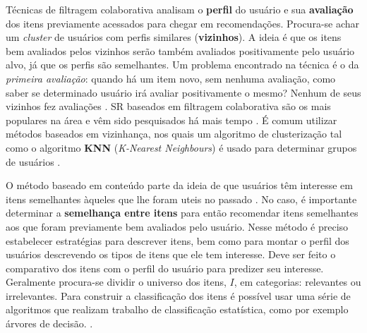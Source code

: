\documentclass[12pt]{article}
\begin{document}
Técnicas de filtragem colaborativa analisam o \textbf{perfil} do usuário e sua \textbf{avaliação} dos itens previamente acessados para chegar em recomendações. Procura-se achar um \textit{cluster} de usuários com perfis similares (\textbf{vizinhos}). A ideia é que os itens bem avaliados pelos vizinhos serão também avaliados positivamente pelo usuário alvo, já que os perfis são semelhantes. Um problema encontrado na técnica é o da \textit{primeira avaliação}: quando há um item novo, sem nenhuma avaliação, como saber se determinado usuário irá avaliar positivamente o mesmo? Nenhum de seus vizinhos fez avaliações \cite{ricci2011introduction}. SR baseados em filtragem colaborativa são os mais populares na área e vêm sido pesquisados há mais tempo \cite{ricci2011introduction}. É comum utilizar métodos baseados em vizinhança, nos quais um algoritmo de clusterização tal como o algoritmo \textbf{KNN} (\textit{K-Nearest Neighbours}) é usado para determinar grupos de usuários \cite{da2018desenvolvimento}.

O método baseado em conteúdo parte da ideia de que usuários têm interesse em itens semelhantes àqueles que lhe foram uteis no passado \cite{ricci2011introduction}. No caso, é importante determinar a \textbf{semelhança entre itens} para então recomendar itens semelhantes aos que foram previamente bem avaliados pelo usuário. Nesse método é preciso estabelecer estratégias para descrever itens, bem como para montar o perfil dos usuários descrevendo os tipos de itens que ele tem interesse. Deve ser feito o comparativo dos itens com o perfil do usuário para predizer seu interesse. Geralmente procura-se dividir o universo dos itens, $I$, em categorias: relevantes ou irrelevantes. Para construir a classificação dos itens é possível usar uma série de algoritmos que realizam trabalho de classificação estatística, como por exemplo árvores de decisão. \cite{pazzani2007content}.
\end{document}
